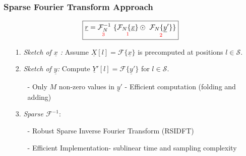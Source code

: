 \documentclass[10pt,xcolor=table]{beamer}
\newcommand{\xv}{\underline{x}}
\newcommand{\yv}{\underline{y}}
\newcommand{\rv}{\underline{r}}
\newcommand{\Yv}{\underline{Y}}
\newcommand{\Xv}{\underline{X}}
\begin{document}
\begin{frame}\frametitle{Sparse Fourier Transform Approach}
	\begin{figure}[t]
		\centering
		\scalebox{0.28}{}
	\end{figure}
\vspace{-0.2cm}
	 	\begin{block}{}
	 		\begin{equation}\label{eqn:Rxy_fourier}\nonumber
	 		\boxed{\rv = \underset{\text{\color{red} 3 } } {\mathcal{F}_{N}^{-1}} \ \{ \underset{\text{ \color{red} 1 } }{  \mathcal{F}_{N}\{\xv\}}  \odot \ \underset{\text{ \color{red} 2 } }{ \mathcal{F}_{N}\{\yv'\}}  \} }
	 		\end{equation}
	 		
	 		\begin{itemize}
	 			\item[\color{red} 1.] \textit{\color{blue} Sketch of $\xv$ : }  Assume $ \Xv[l] = \mathcal{F}\{\xv\}$ is precomputed at positions $l \in \mathcal{S}$.
	 			
	 			\item[\color{red} 2.] \textit{\color{blue} Sketch of $\yv$:}  Compute $ \Yv'[l] = \mathcal{F}\{\yv'\}$ for $l \in \mathcal{S}$.
	 			\begin{itemize}
	 				\item[-] Only $M$ non-zero values in $\yv'$ - Efficient computation (folding and adding)
	 			\end{itemize}
	 			
	 			\item[\color{red} 3.] \textit{\color{blue} Sparse $\mathcal{F}^{-1}$}:
	 			\begin{itemize}
	 				\item[-] Robust Sparse Inverse Fourier Transform (RSIDFT)
	 				\item[-] Efficient Implementation- {\color{blue} sublinear} time and sampling complexity
	 			\end{itemize}
	 		\end{itemize}
	 	\end{block}
\end{frame}
\end{document}
